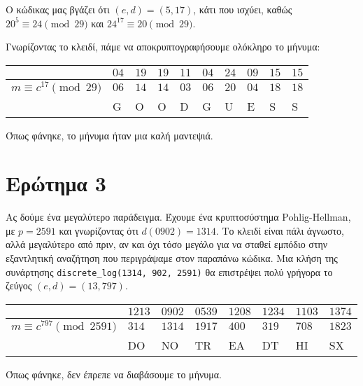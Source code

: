 \documentclass{article}
\begin{document}
Ο κώδικας μας βγάζει ότι $(e, d) = (5, 17)$, κάτι που ισχύει, καθώς $20^5 \equiv 24 \pmod{29}$ και $24^{17} \equiv 20 \pmod{29}$.

Γνωρίζοντας το κλειδί, πάμε να αποκρυπτογραφήσουμε ολόκληρο το μήνυμα:

\begin{longtable}[c]{|l|l|l|l|l|l|l|l|l|l|}
\hline
& $04$ & $19$ & $19$ & $11$ & $04$ & $24$ & $09$ & $15$ & $15$ \\
\hline
$m \equiv c^{17} \pmod{29}$ & $06$ & $14$ & $14$ & $03$ & $06$ & $20$ & $04$ & $18$ & $18$ \\
\hline
& G & O & O & D & G & U & E & S & S \\
\hline
\end{longtable}

Όπως φάνηκε, το μήνυμα ήταν μια καλή μαντεψιά.

\section*{Ερώτημα 3}

Ας δούμε ένα μεγαλύτερο παράδειγμα. Έχουμε ένα κρυπτοσύστημα Pohlig-Hellman, με $p = 2591$ και γνωρίζοντας ότι $d(0902) = 1314$. Το κλειδί είναι πάλι άγνωστο, αλλά μεγαλύτερο από πριν, αν και όχι τόσο μεγάλο για να σταθεί εμπόδιο στην εξαντλητική αναζήτηση που περιγράψαμε στον παραπάνω κώδικα. Μια κλήση της συνάρτησης \lstinline|discrete_log(1314, 902, 2591)| θα επιστρέψει πολύ γρήγορα το ζεύγος $(e, d) = (13, 797)$. 

\begin{longtable}[c]{|l|l|l|l|l|l|l|l|}
\hline
& $1213$ & $0902$ & $0539$ & $1208$ & $1234$ & $1103$ & $1374$ \\
\hline
$m \equiv c^{797} \pmod{2591}$ & $314$ & $1314$ & $1917$ & $400$ & $319$ & $708$ & $1823$ \\
\hline
& DO & NO & TR & EA & DT & HI & SX \\
\hline
\end{longtable}

Όπως φάνηκε, δεν έπρεπε να διαβάσουμε το μήνυμα.
\end{document}
